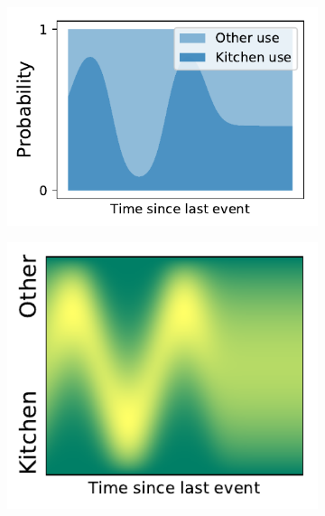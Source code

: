 \begin{figure}
        \vspace{-0.5cm}
        \centering
        \begin{subfigure}{.5 \linewidth}
                \centering
                \includegraphics[width=\linewidth]{sections/010_neurips2019/paper/images/categorical_evolution2.pdf}
                \vspace*{-0.6cm}
                \caption{}
                \label{fig:kitchen_categorical}
        \end{subfigure}
        \begin{subfigure}{.4 \linewidth}
                \centering
                \includegraphics[width=\linewidth]{sections/010_neurips2019/paper/images/dirichlet_evolution.pdf}

\end{subfigure}
\end{figure}
